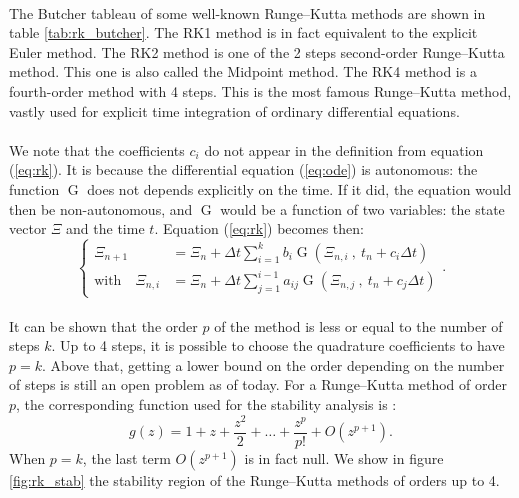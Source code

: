         \paragraph{}
        The Butcher tableau of some well-known Runge--Kutta methods are shown in table \ref{tab:rk_butcher}.
        The RK1 method is in fact equivalent to the explicit Euler method.
        The RK2 method is one of the 2 steps second-order Runge--Kutta method.
        This one is also called the Midpoint method.
        The RK4 method is a fourth-order method with 4 steps.
        This is the most famous Runge--Kutta method, vastly used for explicit time integration of ordinary differential equations.

        \paragraph{}
        We note that the coefficients $c_i$ do not appear in the definition from equation (\ref{eq:rk}).
        It is because the differential equation (\ref{eq:ode}) is autonomous: the function $\operatorname{G}$ does not depends explicitly on the time.
        If it did, the equation would then be non-autonomous, and $\operatorname{G}$ would be a function of two variables: the state vector $\Xi$ and the time $t$.
        Equation (\ref{eq:rk}) becomes then:
        \begin{equation}
          \left\{\begin{aligned}
            \Xi_{n+1} &= \Xi_n + \Delta t \sum_{i = 1}^k b_i \operatorname{G}\left(\Xi_{n,i} \ ,\  t_n + c_i \Delta t\right) \\
            \textrm{with}\quad \Xi_{n,i} &= \Xi_n + \Delta t \sum_{j = 1}^{i-1} a_{ij} \operatorname{G}\left(\Xi_{n,j} \ ,\  t_n + c_j \Delta t\right)
          \end{aligned}\right. .
        \end{equation}

        \paragraph{}
        It can be shown that the order $p$ of the method is less or equal to the number of steps $k$.
        Up to 4 steps, it is possible to choose the quadrature coefficients to have $p = k$.
        Above that, getting a lower bound on the order depending on the number of steps is still an open problem as of today.
        For a Runge--Kutta method of order $p$, the corresponding function used for the stability analysis is \cite{HairerWanner1996}:
        \begin{equation}
          g\left(z\right) = 1 + z + \frac{z^2}{2} + \dots + \frac{z^p}{p!} + O\left(z^{p+1}\right) .
        \end{equation}
        When $p = k$, the last term $O\left(z^{p+1}\right)$ is in fact null.
        We show in figure \ref{fig:rk_stab} the stability region of the Runge--Kutta methods of orders up to 4.

